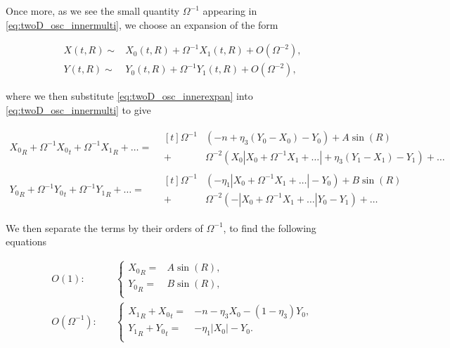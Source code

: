 Once more, as we see the small quantity $\Omega^{-1}$ appearing in \eqref{eq:twoD_osc_innermulti}, we choose an expansion of the form

\begin{equation}\label{eq:twoD_osc_innerexpan}
\begin{aligned}
X(t,R)\sim& X_0(t,R)+\Omega^{-1}X_1(t,R)+O(\Omega^{-2}),\\
Y(t,R)\sim& Y_0(t,R)+\Omega^{-1}Y_1(t,R)+O(\Omega^{-2}),
\end{aligned}
\end{equation}

where we then substitute \eqref{eq:twoD_osc_innerexpan} into \eqref{eq:twoD_osc_innermulti} to give

\begin{equation*}
\begin{aligned}
{X_0}_R+\Omega^{-1}{X_0}_t+\Omega^{-1}{X_1}_R+\ldots=&\begin{aligned}[t]\Omega^{-1}&(-n+\eta_3(Y_0-X_0)-Y_0)+A\sin(R)\\
+&\Omega^{-2}(X_0|X_0+\Omega^{-1}X_1+\ldots|+\eta_3(Y_1-X_1)-Y_1)+\ldots
\end{aligned}\\
{Y_0}_R+\Omega^{-1}{Y_0}_t+\Omega^{-1}{Y_1}_R+\ldots=&\begin{aligned}[t]\Omega^{-1}&(-\eta_1|X_0+\Omega^{-1}X_1+\ldots|-Y_0)+B\sin(R)\\
+&\Omega^{-2}(-|X_0+\Omega^{-1}X_1+\ldots|Y_0-Y_1)+\ldots
\end{aligned}
\end{aligned}
\end{equation*}

We then separate the terms by their orders of $\Omega^{-1}$, to find the following equations

\begin{align}
\label{eq:twoD_osc_innerO1}
O(1):\quad & \begin{cases}
	{X_0}_R =& A\sin(R), \\
	{Y_0}_R =& B\sin(R),\\
\end{cases}\\
\label{eq:twoD_osc_innerO2}
O(\Omega^{-1}):\quad & \begin{cases}
	{X_1}_R+{X_0}_t =& -n-\eta_3X_0-(1-\eta_3)Y_0, \\
	{Y_1}_R+{Y_0}_t =& -\eta_1|X_0|-Y_0.\\
\end{cases}
\end{align}

